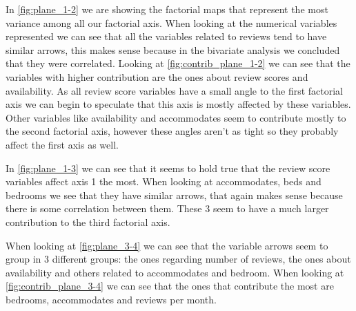 \newcommand{\contrib}[2]{
    \begin{figure}[H]
        \centering
        \texttt{[image: pca\_fact-plane\_\#1\_\#2-contrib]}
        \caption{PCA variable contributions of plane #1 vs #2}%
        \label{fig:contrib_plane_#1-#2}
    \end{figure}
}

\newcommand{\categorica}[4]{
    \begin{figure}[H]
        \centering
        \texttt{[image: pca\_fact-\#3-plane\_\#1\_\#2]}
        \caption{PCA variable contributions of #4 in plane #1 vs #2}%
        \label{fig:cat-#3-plane-#1-#2}
    \end{figure}
}



In \cref{fig:plane_1-2} we are showing the factorial maps that represent the most variance among all our factorial axis. When looking at the numerical variables represented we can see that all the variables
related to reviews tend to have similar arrows, this makes sense 
because in the bivariate analysis we concluded that they were correlated.
Looking at \cref{fig:contrib_plane_1-2} we can see that the variables
with higher contribution are the ones about review scores and availability. As all review score variables have a small angle to the first factorial axis we can begin to speculate that this axis is 
mostly affected by these variables. Other variables like availability
and accommodates seem to contribute mostly to the second factorial axis, however these angles aren't as tight so they probably affect the first axis as well.


In \cref{fig:plane_1-3} we can see that it seems to hold true that 
the review score variables affect axis 1 the most. When looking at accommodates, beds and bedrooms we see that they have similar arrows,
that again makes sense because there is some correlation between them.
These 3 seem to have a much larger contribution to the third factorial axis.



When looking at \cref{fig:plane_3-4} we can see that the variable arrows seem to group in 3 different groups: the ones regarding number of reviews, the ones about availability and others related to accommodates and bedroom. When looking at \cref{fig:contrib_plane_3-4} we can see
that the ones that contribute the most are bedrooms, accommodates 
and reviews per month. 


